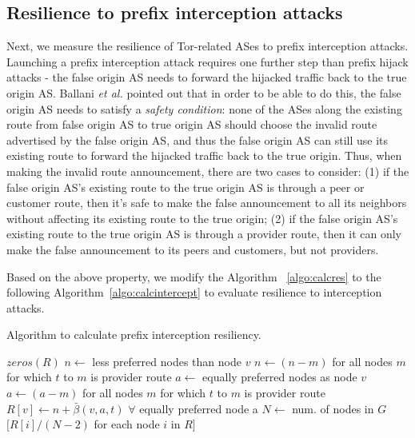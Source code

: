 \subsection{Resilience to prefix interception attacks}
\label{interception_methodology}
Next, we measure the resilience of Tor-related ASes to prefix interception attacks. Launching a prefix interception attack requires one further step than prefix hijack attacks - the false origin AS needs to forward the hijacked traffic back to the true origin AS. Ballani \emph{et al.} \cite{ballani2007study} pointed out that in order to be able to do this, the false origin AS needs to satisfy a \emph{safety condition}: none of the ASes along the existing route from false origin AS to true origin AS should choose the invalid route advertised by the false origin AS, and thus the false origin AS can still use its existing route to forward the hijacked traffic back to the true origin. Thus, when making the invalid route announcement, there are two cases to consider: (1) if the false origin AS's existing route to the true origin AS is through a peer or customer route, then it's safe to make the false announcement to all its neighbors without affecting its existing route to the true origin; (2) if the false origin AS's existing route to the true origin AS is through a provider route, then it can only make the false announcement to its peers and customers, but not providers. 

Based on the above property, we modify the Algorithm ~\ref{algo:calcres} to the following Algorithm~\ref{algo:calcintercept} to evaluate resilience to interception attacks. 

\begin{algorithm}
\caption{Algorithm to calculate prefix interception resiliency.}
\label{algo:calcintercept}
\begin{algorithmic}
    \State {}
    \State $zeros(R)$
		\State $n \gets$ less preferred nodes than node $v$
			\State $n \gets (n - m)$ for all nodes $m$ for which $t$ to $m$ is provider route
		\EndIf
		\State $a \gets$ equally preferred nodes as node $v$
			\State $a \gets (a - m)$ for all nodes $m$ for which $t$ to $m$ is provider route
		\EndIf
		\State $R[v] \gets n + \bar{\beta}(v,a,t)$ $\forall$ equally preferred node a
	\EndIf
    \EndFor
    \State $N \gets$ num. of nodes in $G$
    \State \Return $[R[i] / (N-2)$ for each node $i$ in $R]$
\EndFunction
\end{algorithmic}
\end{algorithm}

